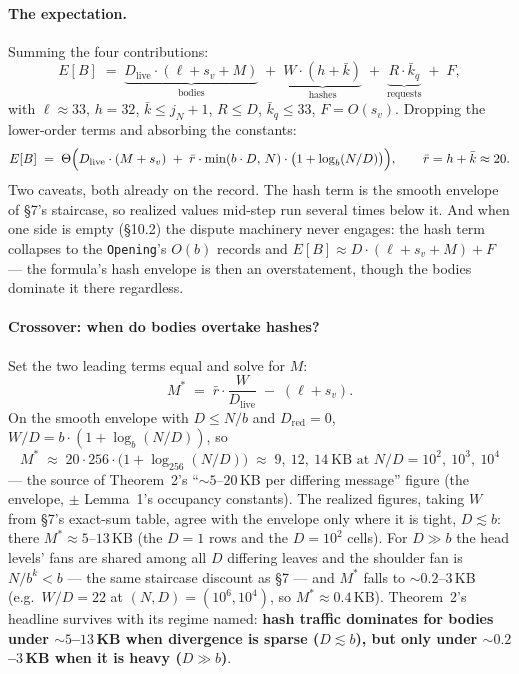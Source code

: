 \documentclass[11pt]{article}
\newcommand{\code}[1]{\texttt{#1}}
\theoremstyle{plain}
\begin{document}
\paragraph{The expectation.} Summing the four contributions:
\begin{equation*}
E[B] \;=\;
\underbrace{D_{\mathrm{live}} \cdot (\ell + s_v + M)}_{\text{bodies}}
\;+\; \underbrace{W \cdot (h + \bar{k})}_{\text{hashes}}
\;+\; \underbrace{R \cdot \bar{k}_q}_{\text{requests}}
\;+\; F,
\end{equation*}
with $\ell \approx 33$, $h = 32$, $\bar{k} \le j_N + 1$, $R \le D$,
$\bar{k}_q \le 33$, $F = O(s_v)$. Dropping the lower-order terms and
absorbing the constants:
\begin{equation*}
E[B] \;=\; \Theta\Bigl( D_{\mathrm{live}} \cdot (M + s_v)
\;+\; \bar{r} \cdot \min(b \cdot D,\, N) \cdot
\bigl(1 + \log_b(N/D)\bigr) \Bigr),
\qquad \bar{r} = h + \bar{k} \approx 20.
\end{equation*}
Two caveats, both already on the record. The hash term is the smooth
envelope of \S7's staircase, so realized values mid-step run several times
below it. And when one side is empty (\S10.2) the dispute machinery never
engages: the hash term collapses to the \code{Opening}'s $O(b)$ records
and $E[B] \approx D \cdot (\ell + s_v + M) + F$ --- the formula's hash
envelope is then an overstatement, though the bodies dominate it there
regardless.

\paragraph{Crossover: when do bodies overtake hashes?} Set the two leading
terms equal and solve for $M$:
\begin{equation*}
M^* \;=\; \bar{r} \cdot \frac{W}{D_{\mathrm{live}}} \;-\; (\ell + s_v).
\end{equation*}
On the smooth envelope with $D \le N/b$ and $D_{\mathrm{red}} = 0$,
$W/D = b \cdot (1 + \log_b(N/D))$, so
\begin{equation*}
M^* \;\approx\; 20 \cdot 256 \cdot \bigl(1 + \log_{256}(N/D)\bigr)
\;\approx\; 9,\ 12,\ 14\ \text{KB at } N/D = 10^2,\ 10^3,\ 10^4
\end{equation*}
--- the source of Theorem~2's ``${\sim}5$--$20$\,KB per differing
message'' figure (the envelope, $\pm$ Lemma~1's occupancy constants). The
realized figures, taking $W$ from \S7's exact-sum table, agree with the
envelope only where it is tight, $D \lesssim b$: there
$M^* \approx 5$--$13$\,KB (the $D = 1$ rows and the $D = 10^2$ cells).
For $D \gg b$ the head levels' fans are shared among all $D$ differing
leaves and the shoulder fan is $N/b^k < b$ --- the same staircase discount
as \S7 --- and $M^*$ falls to ${\sim}0.2$--$3$\,KB (e.g.\ $W/D = 22$ at
$(N, D) = (10^6, 10^4)$, so $M^* \approx 0.4$\,KB). Theorem~2's headline
survives with its regime named: \textbf{hash traffic dominates for bodies
under ${\sim}5$--$13$\,KB when divergence is sparse ($D \lesssim b$), but
only under ${\sim}0.2$--$3$\,KB when it is heavy ($D \gg b$)}.
\end{document}
